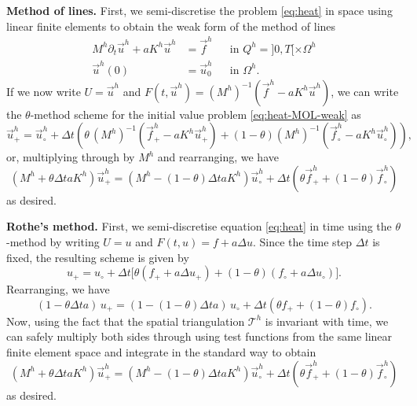 \vspace{0.5cm}
\begin{solution}

\textbf{Method of lines.} First, we semi-discretise the problem \eqref{eq:heat} in space using linear finite elements to obtain the weak form of the method of lines
\begin{equation}\label{eq:heat-MOL-weak}
\begin{aligned}
M^h \partial_t \vec{u}^h + a K^h \vec{u}^h &= \vec{f}^h && \text{in } Q^h = ]0,T[ \times \Omega^h\\
\vec{u}^h(0) &= \vec{u}^h_0 && \text{in } \Omega^h.
\end{aligned}
\end{equation}
If we now write $U = \vec{u}^h$ and
$F(t,\vec{u}^h) = (M^h)^{-1}( \vec{f}^h - a K^h \vec{u}^h )$, we can write the $\theta$-method scheme for the initial value problem \eqref{eq:heat-MOL-weak} as
\begin{equation*}
\vec{u}^h_+ = \vec{u}^h_\circ + \Delta t
\left( \theta \, (M^h)^{-1}( \vec{f}^h_+ - a K^h \vec{u}^h_+ ) + (1-\theta) (M^h)^{-1}( \vec{f}^h_\circ - a K^h \vec{u}^h_\circ ) \right),
\end{equation*}
or, multiplying through by $M^h$ and rearranging, we have
\begin{equation*}
\left( M^h + \theta \Delta t a K^h \right) \vec{u}^h_+ =
\left( M^h - (1-\theta) \Delta t a K^h \right) \vec{u}^h_\circ +
\Delta t \left( \theta \vec{f}^h_+ + (1-\theta) \vec{f}^h_\circ \right)
\end{equation*}
as desired.

\pagebreak
\textbf{Rothe's method.} First, we semi-discretise equation \eqref{eq:heat} in time using the $\theta$-method by writing $U = u$ and $F(t,u) = f + a \Delta u$.
Since the time step $\Delta t$ is fixed, the resulting scheme is given by
\begin{equation*}
u_+ = u_\circ + \Delta t \Big[ \theta (f_+ + a \Delta u_+) + (1-\theta) (f_\circ + a \Delta u_\circ) \Big].
\end{equation*}
Rearranging, we have
\begin{equation*}
(1 - \theta \Delta t a) \, u_+ =
(1 - (1-\theta) \Delta t a ) \, u_\circ + 
\Delta t \left( \theta f_+ + (1-\theta) f_\circ \right).
\end{equation*}
Now, using the fact that the spatial triangulation $\mathcal{T}^h$ is invariant with time, we can safely multiply both sides through using test functions from the same linear finite element  space and integrate in the standard way to obtain 
\begin{equation*}
\left( M^h + \theta \Delta t a K^h \right) \vec{u}^h_+ =
\left( M^h - (1-\theta) \Delta t a K^h \right) \vec{u}^h_\circ +
\Delta t \left( \theta \vec{f}^h_+ + (1-\theta) \vec{f}^h_\circ \right)
\end{equation*}
as desired.

\end{solution}


